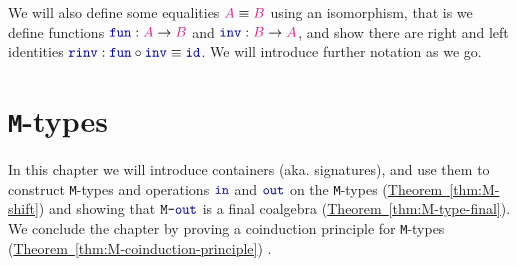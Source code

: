 \documentclass[twoside,11pt,openright]{report}
\theoremstyle{plain} %
\theoremstyle{definition}
\theoremstyle{remark}
\newcommand*{\thmref}[1]{\hyperref[thm:#1]{Theorem~\ref*{thm:#1}}} %
\newcommand*{\type}[1]{\textcolor{magenta!90!black}{#1}}
\newcommand*{\coalg}[2]{#1\texttt{-}#2}
\newcommand*{\function}[1]{\textcolor{blue!60!black}{\ensuremath{\mathtt{#1}}}}
\newcommand*{\typeformer}[1]{\ensuremath{\mathtt{#1}}}
\begin{document}
We will also define some equalities \(\type{A} \equiv \type{B}\) using an isomorphism, that is we define functions \(\function{fun} : \type{A} \rightarrow \type{B}\) and \(\function{inv} : \type{B} \rightarrow \type{A}\), and show there are right and left identities \(\function{rinv} : \function{fun} \circ \function{inv} \equiv \function{id}\).
\noindent We will introduce further notation as we go.


\chapter{\texttt{M}-types}
\label{ch:M-types}
In this chapter we will introduce containers (aka. signatures), and use them to construct \texttt{M}-types and operations \(\function{in}\) and \(\function{out}\) on the \texttt{M}-types (\thmref{M-shift}) and showing that \(\coalg{\typeformer{M}}{\function{out}}\) is a final coalgebra (\thmref{M-type-final}). We conclude the chapter by proving a coinduction principle for \texttt{M}-types (\thmref{M-coinduction-principle}) \cite{DBLP:non-wellfounded}.
\end{document}
